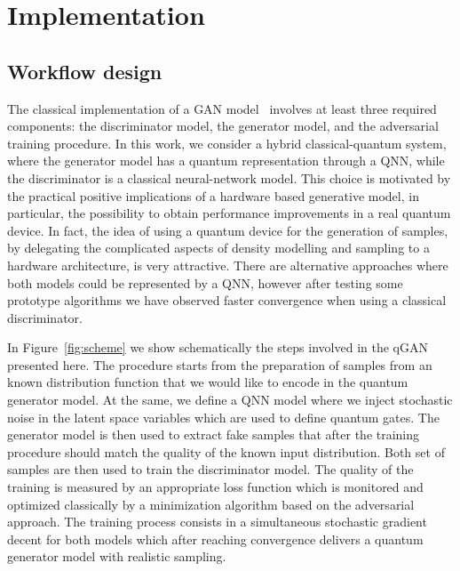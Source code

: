 \documentclass[twocolumn,preprintnumbers,superscriptaddress]{revtex4-2}
\begin{document}
\section{Implementation}
\label{sec:implementation}

\subsection{Workflow design}

The classical implementation of a GAN model~\cite{goodfellow2014generative}
involves at least three required components: the discriminator model, the
generator model, and the adversarial training procedure. In this work, we
consider a hybrid classical-quantum system, where the generator model has a
quantum representation through a QNN, while the
discriminator is a classical neural-network model. This choice is motivated by
the practical positive implications of a hardware based generative model, in
particular, the possibility to obtain performance improvements in a real quantum
device. In fact, the idea of using a quantum device for the generation of
samples, by delegating the complicated aspects of density modelling and sampling
to a hardware architecture, is very attractive.
%
There are alternative approaches where both models could be represented by a
QNN, however after testing some prototype algorithms we
have observed faster convergence when using a classical discriminator.

In Figure~\ref{fig:scheme} we show schematically the steps involved in the qGAN
presented here. The procedure starts from the preparation of samples from an
known distribution function that we would like to encode in the quantum
generator model. At the same, we define a QNN model where
we inject stochastic noise in the latent space variables which are used to
define quantum gates. The generator model is then used to extract fake samples
that after the training procedure should match the quality of the known input
distribution. Both set of samples are then used to train the discriminator
model. The quality of the training is measured by an appropriate loss function
which is monitored and optimized classically by a minimization algorithm based on
the adversarial approach. The training process consists in a simultaneous
stochastic gradient decent for both models which after reaching convergence
delivers a quantum generator model with realistic sampling.
\end{document}
